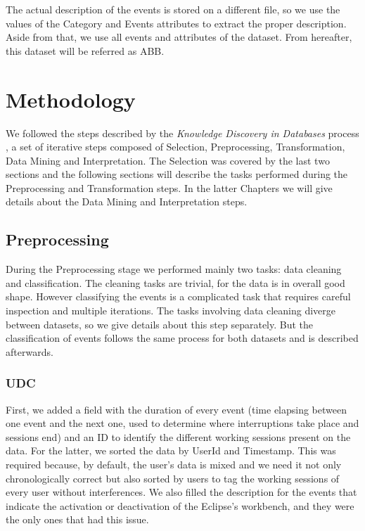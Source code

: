 The actual description of the events is stored on a different file, so we use the values of the Category and Events attributes to extract the proper description. Aside from that, we use all events and attributes of the dataset. From hereafter, this dataset will be referred as ABB.

\section{Methodology}
We followed the steps described by the \emph{Knowledge Discovery in Databases} process \cite{FPG96}, a set of iterative steps composed of Selection, Preprocessing, Transformation, Data Mining and Interpretation. The Selection was covered by the last two sections and the following sections will describe the tasks performed during the Preprocessing and Transformation steps. In the latter Chapters we will give details about the Data Mining and Interpretation steps.

\subsection{Preprocessing}
During the Preprocessing stage we performed mainly two tasks: data cleaning and classification. The cleaning tasks are trivial, for the data is in overall good shape. However classifying the events is a complicated task that requires careful inspection and multiple iterations. The tasks involving data cleaning diverge between datasets, so we give details about this step separately. But the classification of events follows the same process for both datasets and is described afterwards.

\subsubsection{UDC}
First, we added a field with the duration of every event (time elapsing between one event and the next one, used to determine where interruptions take place and sessions end) and an ID to identify the different working sessions present on the data. For the latter, we sorted the data by UserId and Timestamp. This was required because, by default, the user's data is mixed and we need it not only chronologically correct but also sorted by users to tag the working sessions of every user without interferences. We also filled the description for the events that indicate the activation or deactivation of the Eclipse's workbench, and they were the only ones that had this issue.

